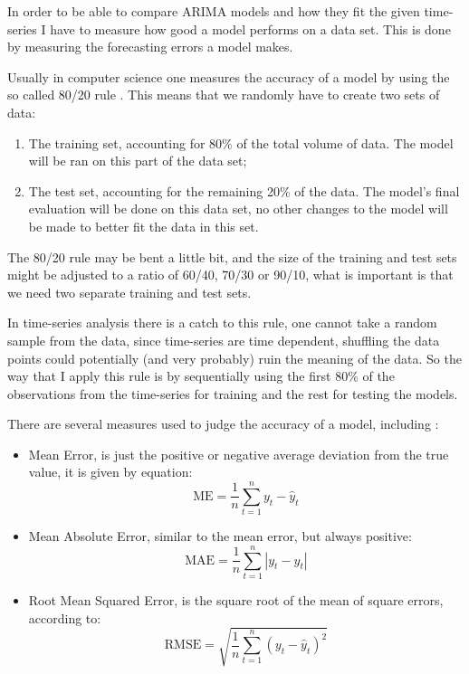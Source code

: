 \documentclass[12pt,a4paper,titlepage]{report}
\begin{document}
In order to be able to compare ARIMA models and how they fit the given time-series I have to measure how good a model performs on a data set.
This is done by measuring the forecasting errors a model makes.

Usually in computer science one measures the accuracy of a model by using the so called 80/20 rule \cite{8020rule}. This means that we randomly have to create two sets of data:

\begin{enumerate}
    \item The training set, accounting for 80\% of the total volume of data. The model will be ran on this part of the data set;
    \item The test set, accounting for the remaining 20\% of the data. The model's final evaluation will be done on this data set, no other changes to the model will be made to better fit the data in this set.
\end{enumerate}

The 80/20 rule may be bent a little bit, and the size of the training and test sets might be adjusted to a ratio of 60/40, 70/30 or 90/10, what is important is that we need two separate training and test sets.

In time-series analysis there is a catch to this rule, one cannot take a random sample from the data, since time-series are time dependent, shuffling the data points could potentially (and very probably) ruin the meaning of the data. So the way that I apply this rule is by sequentially using the first 80\% of the observations from the time-series for training and the rest for testing the models.

There are several measures used to judge the accuracy of a model, including \cite{Hyndman06anotherlook}:
\begin{itemize}
    \item Mean Error, is just the positive or negative average deviation from the true value, it is given by equation:
    \begin{equation}
        \text{ME} = \frac{1}{n} \sum_{t=1}^{n} y_{t}-\hat{y}_{t}
    \end{equation}
    
    \item Mean Absolute Error, similar to the mean error, but always positive:
    \begin{equation}
        \text{MAE} = \frac{1}{n} \sum_{t=1}^{n} |y_{t}-\hat{y}_{t}|
    \end{equation}
    
    \item Root Mean Squared Error, is the square root of the mean of square errors, according to: 
    \begin{equation}
        \text{RMSE} = \sqrt{\frac{1}{n} \sum_{t=1}^{n} (y_{t}-\hat{y}_{t})^2}
    \end{equation}
\end{itemize}
\end{document}
